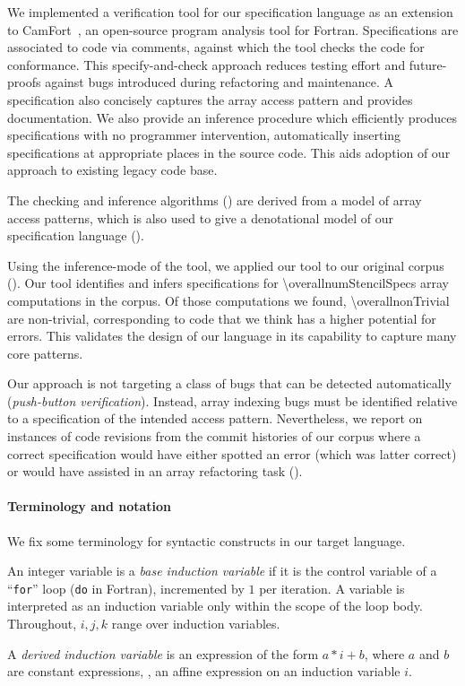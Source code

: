 We implemented a verification tool for our specification language as
an extension to CamFort~\cite{camfort}, an open-source program
analysis tool for Fortran. Specifications are associated to code via
comments, against which the tool checks the code for conformance. This
specify-and-check approach reduces testing effort and future-proofs
against bugs introduced during refactoring and maintenance. A
specification also concisely captures the array access pattern
and provides documentation. We also provide an inference procedure
which efficiently produces specifications with no programmer
intervention, automatically inserting specifications at appropriate
places in the source code. This aids adoption of our approach to
existing legacy code base.

The checking and inference algorithms () are
derived from a model of array access patterns, which is also used to
give a denotational model of our specification language
().

Using the inference-mode of the tool, we applied our tool to our
original corpus (). Our tool identifies and
infers specifications for \num{\overallnumStencilSpecs} array computations in the
corpus. Of those computations we found, \num{\overallnonTrivial} are non-trivial,
corresponding to code that we think has a higher potential for errors. This
validates the design of our language in its capability to capture many
core patterns.

Our approach is not targeting a class of bugs that can be detected
automatically (\emph{push-button verification}). Instead, array
indexing bugs must be identified relative to a specification of the
intended access pattern.  Nevertheless, we report on instances of code
revisions from the commit histories of our corpus where a
correct specification would have either spotted an error (which was
latter correct) or would have assisted in an array refactoring task
().

\paragraph{Terminology and notation}

We fix some terminology for syntactic constructs in our target language.

\begin{defn}
  An integer variable is a \emph{base induction variable} if it is the
  control variable of a ``\texttt{for}'' loop (\texttt{do} in
  Fortran), incremented by $1$ per iteration. A variable is
  interpreted as an induction variable only within the scope of the
  loop body. Throughout, $i, j, k$ range over induction variables.

  A \emph{derived induction variable} is an expression of the form
  $a \ast i + b$, where $a$ and $b$ are constant expressions, \ie{},
  an affine expression on an induction variable $i$.
\end{defn}

